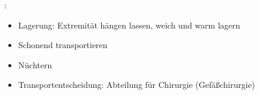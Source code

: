 
\label{m:arterieller-gefaessverschluss}
:

\begin{itemize}
  \item Lagerung: Extremität hängen lassen, weich und warm lagern
  \item Schonend transportieren
  \item Nüchtern
  \item Transportentscheidung: Abteilung für Chirurgie
  (Gefäßchirurgie)
\end{itemize}